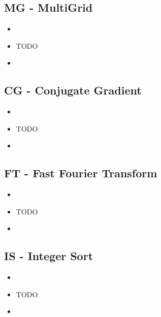 \documentclass{beamer}
\begin{document}
		\subsection{MG - MultiGrid}

			\begin{frame}
				\large{\textsc{\insertsubsectionhead}}
				\begin{itemize}
					\item[]
					\item TODO
					\item[]
				\end{itemize}
			\end{frame}

		\subsection{CG - Conjugate Gradient}

			\begin{frame}
				\large{\textsc{\insertsubsectionhead}}
				\begin{itemize}
					\item[]
					\item TODO
					\item[]
				\end{itemize}
			\end{frame}

		\subsection{FT - Fast Fourier Transform}

			\begin{frame}
				\large{\textsc{\insertsubsectionhead}}
				\begin{itemize}
					\item[]
					\item TODO
					\item[]
				\end{itemize}
			\end{frame}

		\subsection{IS - Integer Sort}

			\begin{frame}
				\large{\textsc{\insertsubsectionhead}}
				\begin{itemize}
					\item[]
					\item TODO
					\item[]
				\end{itemize}
			\end{frame}
\end{document}
